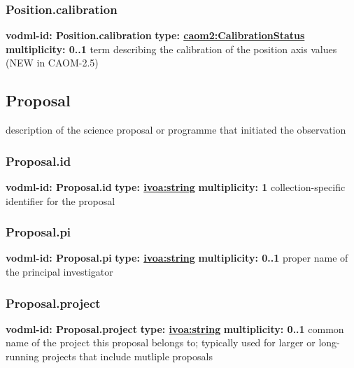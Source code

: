     \subsubsection{Position.calibration}
      \textbf{vodml-id: Position.calibration} \newline
      \textbf{type: \hyperref[sect:CalibrationStatus]{caom2:CalibrationStatus}} \newline
      \textbf{multiplicity: 0..1} \newline
      term describing the calibration of the position axis values (NEW in CAOM-2.5)

  \subsection{Proposal}
  \label{sect:Proposal}
    description of the science proposal or programme that initiated the observation

    \subsubsection{Proposal.id}
      \textbf{vodml-id: Proposal.id} \newline
      \textbf{type: \hyperref[sect:ivoa]{ivoa:string}} \newline
      \textbf{multiplicity: 1} \newline
      collection-specific identifier for the proposal

    \subsubsection{Proposal.pi}
      \textbf{vodml-id: Proposal.pi} \newline
      \textbf{type: \hyperref[sect:ivoa]{ivoa:string}} \newline
      \textbf{multiplicity: 0..1} \newline
      proper name of the principal investigator

    \subsubsection{Proposal.project}
      \textbf{vodml-id: Proposal.project} \newline
      \textbf{type: \hyperref[sect:ivoa]{ivoa:string}} \newline
      \textbf{multiplicity: 0..1} \newline
      common name of the project this proposal belongs to; typically used for larger or long-running projects that include mutliple proposals

